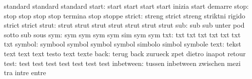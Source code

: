                            standard                  standard
                           standard
                    start: start                     start
                           start                     start
                           inizia                    start
                           demarre
                     stop: stop                      stop
                           stop                      stop
                           termina                   stop
                           stoppe
                   strict: streng                    strict
                           streng                    striktni
                           rigido                    strict
                           strict
                    strut: strut                     strut
                           strut                     strut
                           strut                     strut
                           strut
                      sub: sub                       sub
                           unter                     pod
                           sotto                     sub
                           sous
                      sym: sym                       sym
                           sym                       sym
                           sim                       sym
                           sym
                      txt: txt                       txt
                           txt                       txt
                           txt                       txt
                           txt
                   symbol: symbool                   symbol
                           symbol                    symbol
                           simbolo                   simbol
                           symbole
                     text: tekst                     text
                           text                      text
                           testo                     text
                           texte
                     back: terug                     back
                           zurueck                   zpet
                           dietro                    inapot
                           retour
                     test: test                      test
                           test                      test
                           test                      test
                           test
                inbetween: tussen                    inbetween
                           zwischen                  mezi
                           tra                       intre
                           entre
